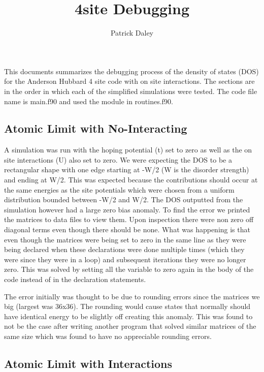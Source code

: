 \documentclass{article}
\title{4site Debugging}
\author{Patrick Daley}
\begin{document}
	
\maketitle
	
This documents summarizes the debugging process of the density of states (DOS) for the Anderson Hubbard 4 site code with on site interactions. The sections are in the order in which each of the simplified simulations were tested. The code file name is main.f90 and used the module in routines.f90.

\subsection*{Atomic Limit with No-Interacting}

A simulation was run with the hoping potential (t) set to zero as well as the on site interactions (U) also set to zero. We were expecting the DOS to be a rectangular shape with one edge starting at -W/2 (W is the disorder strength) and ending at W/2. This was expected because the contributions should occur at the same energies as the site potentials which were chosen from a uniform distribution bounded between -W/2 and W/2. The DOS outputted from the simulation however had a large zero bias anomaly. To find the error we printed the matrices to data files to view them. Upon inspection there were non zero off diagonal terms even though there should be none. What was happening is that even though the matrices were being set to zero in the same line as they were being declared when these declarations were done multiple times (which they were since they were in a loop) and subsequent iterations they were no longer zero. This was solved by setting all the variable to zero again in the body of the code instead of in the declaration statements.

The error initially  was thought to be due to rounding errors since the matrices we big (largest was 36x36). The rounding would cause states that normally should have identical energy to be slightly off creating this anomaly. This was found to not be the case after writing another program that solved similar matrices of the same size which was found to have no appreciable rounding errors.

\subsection*{Atomic Limit with Interactions}
\end{document}

